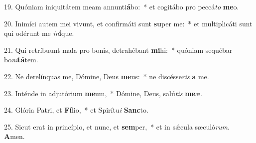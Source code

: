 19. Quóniam iniquitátem meam annunti\textbf{á}bo:~*  et cogitábo pro peccá\textit{to} \textbf{me}o.\

20. Inimíci autem mei vivunt, et confirmáti sunt \textbf{su}per me:~*  et multiplicáti sunt qui odérunt me \textit{in}\textbf{í}que.\

21. Qui retríbuunt mala pro bonis, detrahébant \textbf{mi}hi:~*  quóniam sequébar bo\textit{ni}\textbf{tá}tem.\

22. Ne derelínquas me, Dómine, Deus \textbf{me}us:~*  ne discésse\textit{ris} \textbf{a} me.\

23. Inténde in adjutórium \textbf{me}um,~*  Dómine, Deus, salú\textit{tis} \textbf{me}æ.\

24. Glória Patri, et \textbf{Fí}lio,~*  et Spirítu\textit{i} \textbf{Sanc}to.\

25. Sicut erat in princípio, et nunc, et \textbf{sem}per,~*  et in sǽcula sæculó\textit{rum}. \textbf{A}men.\

